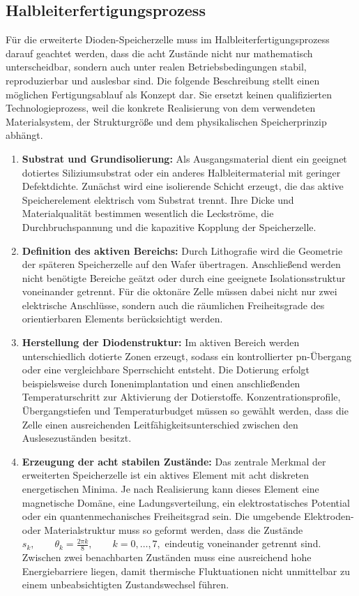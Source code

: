 \documentclass[12pt, a4paper]{article}
\theoremstyle{definition}
\theoremstyle{remark}
\begin{document}
\subsection{Halbleiterfertigungsprozess}
Für die erweiterte Dioden-Speicherzelle muss im Halbleiterfertigungsprozess darauf
geachtet werden, dass die acht Zustände nicht nur mathematisch unterscheidbar,
sondern auch unter realen Betriebsbedingungen stabil, reproduzierbar und
auslesbar sind. Die folgende Beschreibung stellt einen möglichen
Fertigungsablauf als Konzept dar. Sie ersetzt keinen qualifizierten
Technologieprozess, weil die konkrete Realisierung von dem verwendeten
Materialsystem, der Strukturgröße und dem physikalischen Speicherprinzip
abhängt.

\begin{enumerate}[label=\arabic*.]
  \item \textbf{Substrat und Grundisolierung:} Als Ausgangsmaterial dient ein
  geeignet dotiertes Siliziumsubstrat oder ein anderes Halbleitermaterial mit
  geringer Defektdichte. Zunächst wird eine isolierende Schicht erzeugt, die
  das aktive Speicherelement elektrisch vom Substrat trennt. Ihre Dicke und
  Materialqualität bestimmen wesentlich die Leckströme, die Durchbruchspannung
  und die kapazitive Kopplung der Speicherzelle.

  \item \textbf{Definition des aktiven Bereichs:} Durch Lithografie wird die
  Geometrie der späteren Speicherzelle auf den Wafer übertragen. Anschließend
  werden nicht benötigte Bereiche geätzt oder durch eine geeignete
  Isolationsstruktur voneinander getrennt. Für die oktonäre Zelle müssen dabei
  nicht nur zwei elektrische Anschlüsse, sondern auch die räumlichen
  Freiheitsgrade des orientierbaren Elements berücksichtigt werden.

  \item \textbf{Herstellung der Diodenstruktur:} Im aktiven Bereich werden
  unterschiedlich dotierte Zonen erzeugt, sodass ein kontrollierter
  pn-Übergang oder eine vergleichbare Sperrschicht entsteht. Die Dotierung
  erfolgt beispielsweise durch Ionenimplantation und einen anschließenden
  Temperaturschritt zur Aktivierung der Dotierstoffe. Konzentrationsprofile,
  Übergangstiefen und Temperaturbudget müssen so gewählt werden, dass die
  Zelle einen ausreichenden Leitfähigkeitsunterschied zwischen den
  Auslesezuständen besitzt.

  \item \textbf{Erzeugung der acht stabilen Zustände:} Das zentrale Merkmal
  der erweiterten Speicherzelle ist ein aktives Element mit acht diskreten
  energetischen Minima. Je nach Realisierung kann dieses Element eine
  magnetische Domäne, eine Ladungsverteilung, ein elektrostatisches Potential
  oder ein quantenmechanisches Freiheitsgrad sein. Die umgebende Elektroden-
  oder Materialstruktur muss so geformt werden, dass die Zustände
  \(
    s_k,\qquad \theta_k = \frac{2\pi k}{8},
    \qquad k=0,\ldots,7,
  \)
  eindeutig voneinander getrennt sind. Zwischen zwei benachbarten Zuständen
  muss eine ausreichend hohe Energiebarriere liegen, damit thermische
  Fluktuationen nicht unmittelbar zu einem unbeabsichtigten Zustandswechsel
  führen.


\end{enumerate}
\end{document}
